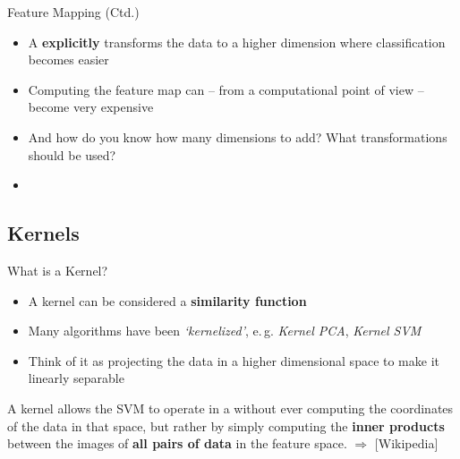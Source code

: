 \begin{frame}{Feature Mapping (Ctd.)}{}
	\begin{itemize}
		\item A  \textbf{explicitly} transforms the data to a higher dimension where classification becomes easier
		\item Computing the feature map can -- from a computational point of view -- become very expensive
		\item And how do you know how many dimensions to add? What transformations should be used?
		\item {}
	\end{itemize}
\end{frame}


\subsection{Kernels}

\begin{frame}{What is a Kernel?}{}
	\begin{itemize}
		\item A kernel can  be considered a \textbf{similarity function}
		\item Many algorithms have been \textit{`kernelized'}, e.\,g. \textit{Kernel PCA}, \textit{Kernel SVM}
		\item Think of it as projecting the data in a higher dimensional space to make it linearly separable
	\end{itemize}
	
	\vspace*{2mm}
	\begin{boxBlueNoFrame}
		\footnotesize
		A kernel allows the SVM to operate in a  without ever
		computing the coordinates of the data in that space, but rather by simply computing the \textbf{inner products}
		between the images of \textbf{all pairs of data} in the feature space. $\Rightarrow$  [Wikipedia]
	\end{boxBlueNoFrame}
\end{frame}


